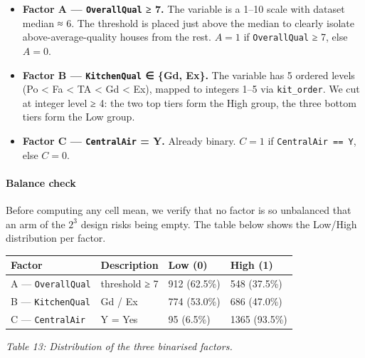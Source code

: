 \begin{itemize}
\tightlist
\item
  \textbf{Factor A --- \texttt{OverallQual} ≥ 7.} The variable is a
  1--10 scale with dataset median ≈ 6. The threshold is placed just
  above the median to clearly isolate above-average-quality houses from
  the rest. \(A = 1\) if \texttt{OverallQual} ≥ 7, else \(A = 0\).
\item
  \textbf{Factor B --- \texttt{KitchenQual} ∈ \{Gd, Ex\}.} The variable
  has 5 ordered levels (Po \textless{} Fa \textless{} TA \textless{} Gd
  \textless{} Ex), mapped to integers 1--5 via \texttt{kit\_order}. We
  cut at integer level ≥ 4: the two top tiers form the High group, the
  three bottom tiers form the Low group.
\item
  \textbf{Factor C --- \texttt{CentralAir} = Y.} Already binary.
  \(C = 1\) if
  \texttt{CentralAir\ ==\ \textquotesingle{}Y\textquotesingle{}}, else
  \(C = 0\).
\end{itemize}

\paragraph{Balance check}\label{balance-check}

Before computing any cell mean, we verify that no factor is so
unbalanced that an arm of the \(2^3\) design risks being empty. The
table below shows the Low/High distribution per factor.

\begin{longtable}[]{@{}llll@{}}
\toprule\noalign{}
Factor & Description & Low (0) & High (1) \\
\midrule\noalign{}
\endhead
\bottomrule\noalign{}
\endlastfoot
A --- \texttt{OverallQual} & threshold ≥ 7 & 912 (62.5\%) & 548
(37.5\%) \\
B --- \texttt{KitchenQual} & Gd / Ex & 774 (53.0\%) & 686 (47.0\%) \\
C --- \texttt{CentralAir} & Y = Yes & 95 (6.5\%) & 1365 (93.5\%) \\
\end{longtable}

\emph{Table 13: Distribution of the three binarised factors.}


